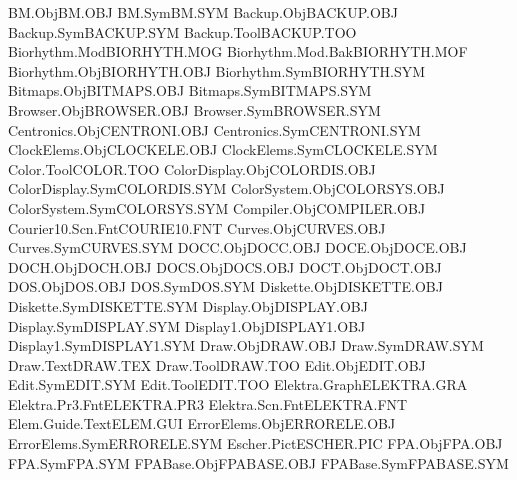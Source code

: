BM.Obj                          BM.OBJ       
BM.Sym                          BM.SYM       
Backup.Obj                      BACKUP.OBJ   
Backup.Sym                      BACKUP.SYM   
Backup.Tool                     BACKUP.TOO   
Biorhythm.Mod                   BIORHYTH.MOG 
Biorhythm.Mod.Bak               BIORHYTH.MOF 
Biorhythm.Obj                   BIORHYTH.OBJ 
Biorhythm.Sym                   BIORHYTH.SYM 
Bitmaps.Obj                     BITMAPS.OBJ  
Bitmaps.Sym                     BITMAPS.SYM  
Browser.Obj                     BROWSER.OBJ  
Browser.Sym                     BROWSER.SYM  
Centronics.Obj                  CENTRONI.OBJ 
Centronics.Sym                  CENTRONI.SYM 
ClockElems.Obj                  CLOCKELE.OBJ 
ClockElems.Sym                  CLOCKELE.SYM 
Color.Tool                      COLOR.TOO    
ColorDisplay.Obj                COLORDIS.OBJ 
ColorDisplay.Sym                COLORDIS.SYM 
ColorSystem.Obj                 COLORSYS.OBJ 
ColorSystem.Sym                 COLORSYS.SYM 
Compiler.Obj                    COMPILER.OBJ 
Courier10.Scn.Fnt               COURIE10.FNT 
Curves.Obj                      CURVES.OBJ   
Curves.Sym                      CURVES.SYM   
DOCC.Obj                        DOCC.OBJ     
DOCE.Obj                        DOCE.OBJ     
DOCH.Obj                        DOCH.OBJ     
DOCS.Obj                        DOCS.OBJ     
DOCT.Obj                        DOCT.OBJ     
DOS.Obj                         DOS.OBJ      
DOS.Sym                         DOS.SYM      
Diskette.Obj                    DISKETTE.OBJ 
Diskette.Sym                    DISKETTE.SYM 
Display.Obj                     DISPLAY.OBJ  
Display.Sym                     DISPLAY.SYM  
Display1.Obj                    DISPLAY1.OBJ 
Display1.Sym                    DISPLAY1.SYM 
Draw.Obj                        DRAW.OBJ     
Draw.Sym                        DRAW.SYM     
Draw.Text                       DRAW.TEX     
Draw.Tool                       DRAW.TOO     
Edit.Obj                        EDIT.OBJ     
Edit.Sym                        EDIT.SYM     
Edit.Tool                       EDIT.TOO     
Elektra.Graph                   ELEKTRA.GRA  
Elektra.Pr3.Fnt                 ELEKTRA.PR3  
Elektra.Scn.Fnt                 ELEKTRA.FNT  
Elem.Guide.Text                 ELEM.GUI     
ErrorElems.Obj                  ERRORELE.OBJ 
ErrorElems.Sym                  ERRORELE.SYM 
Escher.Pict                     ESCHER.PIC   
FPA.Obj                         FPA.OBJ      
FPA.Sym                         FPA.SYM      
FPABase.Obj                     FPABASE.OBJ  
FPABase.Sym                     FPABASE.SYM  
